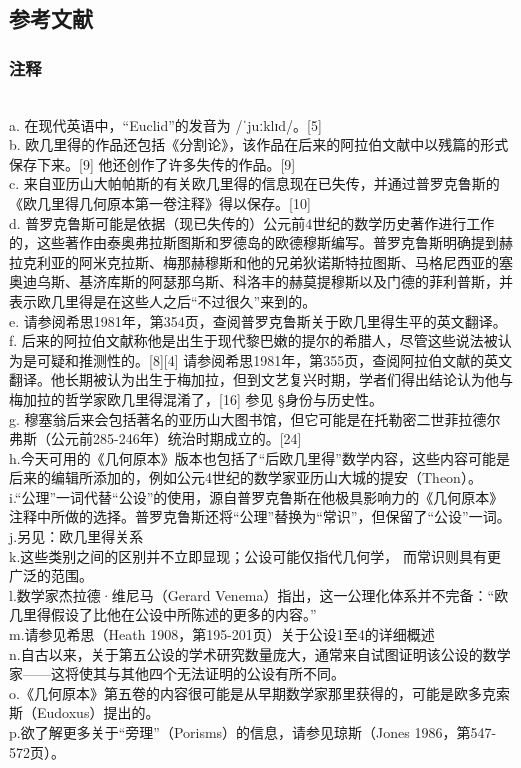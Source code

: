 \subsection{参考文献} 
\subsubsection{注释} \\
a. 在现代英语中，“Euclid”的发音为 /ˈjuːklɪd/。[5]\\  
b. 欧几里得的作品还包括《分割论》，该作品在后来的阿拉伯文献中以残篇的形式保存下来。[9] 他还创作了许多失传的作品。[9]\\  
c. 来自亚历山大帕帕斯的有关欧几里得的信息现在已失传，并通过普罗克鲁斯的《欧几里得几何原本第一卷注释》得以保存。[10]\\  
d. 普罗克鲁斯可能是依据（现已失传的）公元前4世纪的数学历史著作进行工作的，这些著作由泰奥弗拉斯图斯和罗德岛的欧德穆斯编写。普罗克鲁斯明确提到赫拉克利亚的阿米克拉斯、梅那赫穆斯和他的兄弟狄诺斯特拉图斯、马格尼西亚的塞奥迪乌斯、基济库斯的阿瑟那乌斯、科洛丰的赫莫提穆斯以及门德的菲利普斯，并表示欧几里得是在这些人之后“不过很久”来到的。\\  
e. 请参阅希思1981年，第354页，查阅普罗克鲁斯关于欧几里得生平的英文翻译。\\  
f. 后来的阿拉伯文献称他是出生于现代黎巴嫩的提尔的希腊人，尽管这些说法被认为是可疑和推测性的。[8][4] 请参阅希思1981年，第355页，查阅阿拉伯文献的英文翻译。他长期被认为出生于梅加拉，但到文艺复兴时期，学者们得出结论认为他与梅加拉的哲学家欧几里得混淆了，[16] 参见 §身份与历史性。\\  
g. 穆塞翁后来会包括著名的亚历山大图书馆，但它可能是在托勒密二世菲拉德尔弗斯（公元前285-246年）统治时期成立的。[24]\\
h.今天可用的《几何原本》版本也包括了“后欧几里得”数学内容，这些内容可能是后来的编辑所添加的，例如公元4世纪的数学家亚历山大城的提安（Theon）。\\  
i.“公理”一词代替“公设”的使用，源自普罗克鲁斯在他极具影响力的《几何原本》注释中所做的选择。普罗克鲁斯还将“公理”替换为“常识”，但保留了“公设”一词。\\
j.另见：欧几里得关系\\  
k.这些类别之间的区别并不立即显现；公设可能仅指代几何学， 而常识则具有更广泛的范围。\\  
l.数学家杰拉德·维尼马（Gerard Venema）指出，这一公理化体系并不完备：“欧几里得假设了比他在公设中所陈述的更多的内容。”\\
m.请参见希思（Heath 1908，第195-201页）关于公设1至4的详细概述\\  
n.自古以来，关于第五公设的学术研究数量庞大，通常来自试图证明该公设的数学家——这将使其与其他四个无法证明的公设有所不同。\\  
o.《几何原本》第五卷的内容很可能是从早期数学家那里获得的，可能是欧多克索斯（Eudoxus）提出的。\\  
p.欲了解更多关于“旁理”（Porisms）的信息，请参见琼斯（Jones 1986，第547-572页）。
